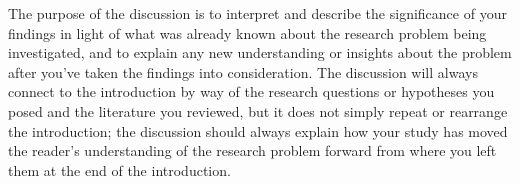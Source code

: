 The purpose of the discussion is to interpret and describe the significance of your findings in light of what was already known about the research problem being investigated, and to explain any new understanding or insights about the problem after you've taken the findings into consideration. The discussion will always connect to the introduction by way of the research questions or hypotheses you posed and the literature you reviewed, but it does not simply repeat or rearrange the introduction; the discussion should always explain how your study has moved the reader's understanding of the research problem forward from where you left them at the end of the introduction.
